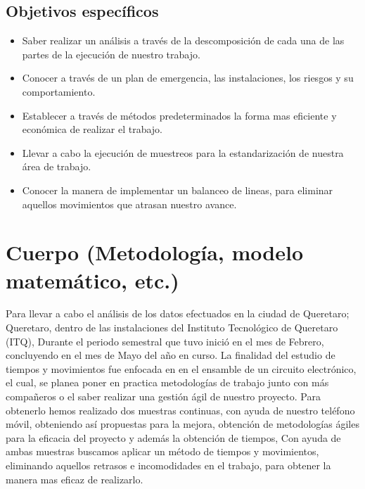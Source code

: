     \subsection{Objetivos específicos }
    
    \begin{itemize}
        \item Saber realizar un análisis a través de la descomposición de cada una de las partes de la ejecución de nuestro trabajo.
        \item Conocer a través de un plan de emergencia, las instalaciones, los riesgos y su comportamiento.
        \item Establecer a través de métodos predeterminados la forma mas eficiente y económica de realizar el trabajo.
        \item Llevar a cabo la ejecución de muestreos para la estandarización de nuestra área de trabajo.
        \item Conocer la manera de implementar un balanceo de lineas, para eliminar aquellos movimientos que atrasan nuestro avance.
    \end{itemize}
    
    \section{Cuerpo (Metodología, modelo matemático, etc.)}
    Para llevar a cabo el análisis de los datos efectuados en la ciudad de Queretaro; Queretaro, dentro de las instalaciones del Instituto Tecnológico de Queretaro (ITQ), Durante el periodo semestral que tuvo inició en el mes de Febrero, concluyendo en el mes de Mayo del año en curso. La finalidad del estudio de tiempos y movimientos fue enfocada en en el ensamble de un circuito electrónico, el cual, se planea poner en practica metodologías de trabajo junto con más compañeros o el saber realizar una gestión ágil de nuestro proyecto. Para obtenerlo hemos realizado dos muestras continuas, con ayuda de nuestro teléfono móvil, obteniendo así propuestas para la mejora, obtención de metodologías ágiles para la eficacia del proyecto y además la obtención de tiempos, Con ayuda de ambas muestras buscamos aplicar un método de tiempos y movimientos, eliminando aquellos retrasos e incomodidades en el trabajo, para obtener la manera mas eficaz de realizarlo. 
